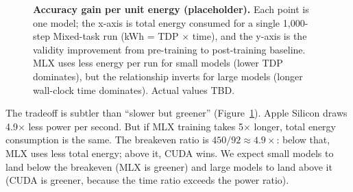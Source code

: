 \documentclass[11pt]{article}
\begin{document}
\begin{figure}[t]
\centering
{}
\caption{\textbf{Accuracy gain per unit energy (placeholder).}  Each point is one model; the x-axis is total energy consumed for a single 1{,}000-step Mixed-task run (kWh = TDP $\times$ time), and the y-axis is the validity improvement from pre-training to post-training baseline.  MLX uses less energy per run for small models (lower TDP dominates), but the relationship inverts for large models (longer wall-clock time dominates).  Actual values TBD.}
\label{fig:energy-efficiency}
\end{figure}

The tradeoff is subtler than ``slower but greener'' (Figure~\ref{fig:energy-efficiency}).  Apple Silicon draws 4.9$\times$ less power per second.  But if MLX training takes 5$\times$ longer, total energy consumption is the same.  The breakeven ratio is $450/92 \approx 4.9\times$: below that, MLX uses less total energy; above it, CUDA wins.  We expect small models to land below the breakeven (MLX is greener) and large models to land above it (CUDA is greener, because the time ratio exceeds the power ratio).
\end{document}
